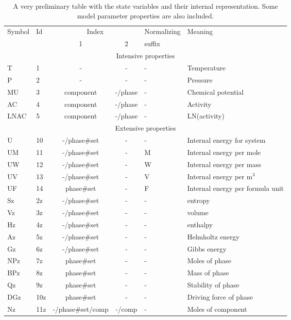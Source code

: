 \documentclass[12pt]{article}
\begin{document}
\begin{table}
\caption{A very preliminary table with the state variables and their
internal representation.  Some model parameter properties are also
included.}\label{tab:statevar}
\begin{tabular}{|llccll|}\hline
Symbol & Id & \multicolumn{2}{c}{Index} & Normalizing & Meaning\\
       &    & 1 & 2                     &  suffix     & \\\hline
\multicolumn{6}{|c|}{Intensive properties}\\\hline
T      & 1  & -         & -    & - & Temperature\\
P      & 2  & -         & -    & - & Pressure\\
MU     & 3  & component & -/phase  & - & Chemical potential\\
AC     & 4  & component & -/phase  & - & Activity\\
LNAC   & 5  & component & -/phase  & - & LN(activity)\\\hline
\multicolumn{6}{|c|}{Extensive properties}\\\hline
U      & 10 & -/phase\#set & - & - & Internal energy for system\\
UM     & 11 & -/phase\#set & - & M & Internal energy per mole\\
UW     & 12 & -/phase\#set & - & W & Internal energy per mass\\
UV     & 13 & -/phase\#set & - & V & Internal energy per m$^3$\\
UF     & 14 & phase\#set   & - & F & Internal energy per formula unit\\
Sz     & 2z & -/phase\#set & - & - & entropy\\
Vz     & 3z & -/phase\#set & - & - & volume\\
Hz     & 4z & -/phase\#set & - & - & enthalpy\\
Az     & 5z & -/phase\#set & - & - & Helmholtz energy\\
Gz     & 6z & -/phase\#set & - & - & Gibbs energy\\
NPz    & 7z &  phase\#set & - & - & Moles of phase\\
BPz    & 8z & phase\#set & - & - & Mass of phase\\
Qz     & 9z & phase\#set & - & -  & Stability of phase\\
DGz    & 10z & phase\#set & - & -  & Driving force of phase\\
Nz     & 11z & -/phase\#set/comp & -/comp & -  & Moles of component\\

\end{tabular}
\end{table}
\end{document}

